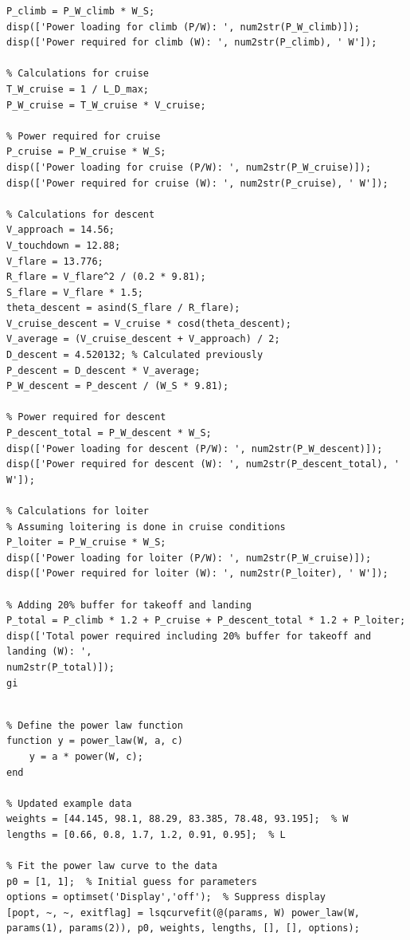 \documentclass[12 pt]{article}
\begin{document}
{\begin{lstlisting}[style=mystyle, caption={MATLAB code for Power Calculations}, label={lst:matlab_code}]
% Power required for climb
P_climb = P_W_climb * W_S;
disp(['Power loading for climb (P/W): ', num2str(P_W_climb)]);
disp(['Power required for climb (W): ', num2str(P_climb), ' W']);

% Calculations for cruise
T_W_cruise = 1 / L_D_max;
P_W_cruise = T_W_cruise * V_cruise;

% Power required for cruise
P_cruise = P_W_cruise * W_S;
disp(['Power loading for cruise (P/W): ', num2str(P_W_cruise)]);
disp(['Power required for cruise (W): ', num2str(P_cruise), ' W']);

% Calculations for descent
V_approach = 14.56;
V_touchdown = 12.88;
V_flare = 13.776;
R_flare = V_flare^2 / (0.2 * 9.81);
S_flare = V_flare * 1.5;
theta_descent = asind(S_flare / R_flare);
V_cruise_descent = V_cruise * cosd(theta_descent);
V_average = (V_cruise_descent + V_approach) / 2;
D_descent = 4.520132; % Calculated previously
P_descent = D_descent * V_average;
P_W_descent = P_descent / (W_S * 9.81);

% Power required for descent
P_descent_total = P_W_descent * W_S;
disp(['Power loading for descent (P/W): ', num2str(P_W_descent)]);
disp(['Power required for descent (W): ', num2str(P_descent_total), ' W']);

% Calculations for loiter
% Assuming loitering is done in cruise conditions
P_loiter = P_W_cruise * W_S;
disp(['Power loading for loiter (P/W): ', num2str(P_W_cruise)]);
disp(['Power required for loiter (W): ', num2str(P_loiter), ' W']);

% Adding 20% buffer for takeoff and landing
P_total = P_climb * 1.2 + P_cruise + P_descent_total * 1.2 + P_loiter;
disp(['Total power required including 20% buffer for takeoff and landing (W): ', 
num2str(P_total)]);
gi

\end{lstlisting}

\begin{lstlisting}[style=mystyle, caption={MATLAB code for Power Calculations}, label={lst:matlab_code}]

% Define the power law function
function y = power_law(W, a, c)
    y = a * power(W, c);
end

% Updated example data
weights = [44.145, 98.1, 88.29, 83.385, 78.48, 93.195];  % W
lengths = [0.66, 0.8, 1.7, 1.2, 0.91, 0.95];  % L

% Fit the power law curve to the data
p0 = [1, 1];  % Initial guess for parameters
options = optimset('Display','off');  % Suppress display
[popt, ~, ~, exitflag] = lsqcurvefit(@(params, W) power_law(W, params(1), params(2)), p0, weights, lengths, [], [], options);


\end{lstlisting}}
\end{document}
